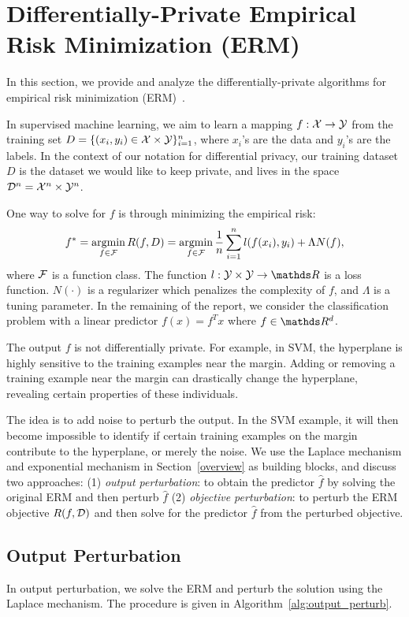 \documentclass{article} %
\begin{document}
\section{Differentially-Private Empirical Risk Minimization (ERM)}\label{section:erm}
In this section, we provide and analyze the differentially-private algorithms for empirical risk minimization (ERM)~\cite{chaudhuri2011erm}.

In supervised machine learning, we aim to learn a mapping $f: \mathcal{X} \rightarrow \mathcal{Y}$
from the training set
$D = \{(x_i, y_i) \in \mathcal{X} \times \mathcal{Y}\}_{i=1}^n$,
where $x_i$'s are the data and $y_i$'s are the labels. In the context of our
notation for differential privacy, our training dataset $D$ is the dataset
we would like to keep private, and lives in the space
$\mathcal{D}^n = \mathcal{X}^n \times \mathcal{Y}^n$.

One way to solve for $f$ is through minimizing the empirical risk:
\[ f^* = \operatorname*{argmin}_{f\in \mathcal{F}} R(f, D)
       = \operatorname*{argmin}_{f\in \mathcal{F}} \frac{1}{n} \sum_{i=1}^n l(f(x_i), y_i) + \Lambda N(f), \]
where $\mathcal{F}$ is a function class. The function $l:\Y \times \Y \rightarrow \R$ is
a loss function. $N(\cdot)$ is a regularizer which penalizes the complexity of
$f$, and $\Lambda$ is a tuning parameter. In the remaining of the report, we
consider the classification problem with a linear predictor $f(x) = f^T x$ where
$f\in \R^d$.

The output $f$ is not differentially private. For example, in SVM, the
hyperplane is highly sensitive to the training examples near the margin. Adding
or removing a training example near the margin can drastically change the
hyperplane, revealing certain properties of these individuals.

The idea is to add noise to perturb the output. In the SVM example, it will then become impossible to identify if certain training examples on the margin contribute to the hyperplane, or merely the noise. We use the Laplace mechanism and exponential mechanism in Section~\ref{overview} as building blocks, and discuss two approaches: (1) \emph{output perturbation}: to obtain the predictor $\hat{f}$ by solving the original ERM and then perturb $\hat{f}$ (2) \emph{objective perturbation}: to perturb the ERM objective $R(f, \mathcal{D})$ and then solve for the predictor $\hat{f}$ from the perturbed objective.

\subsection{Output Perturbation}
In output perturbation, we solve the ERM and perturb the solution using the Laplace mechanism. The procedure is given in Algorithm~\ref{alg:output_perturb}.
\end{document}
